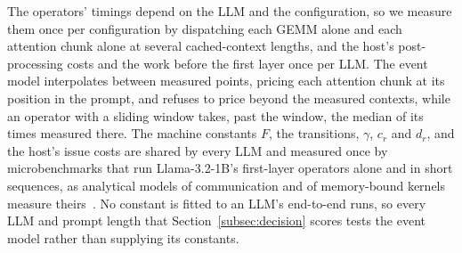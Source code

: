The operators' timings depend on the LLM and the configuration, so we measure them once per configuration by dispatching each GEMM alone and each attention chunk alone at several cached-context lengths, and the host's post-processing costs and the work before the first layer once per LLM.
The event model interpolates between measured points, pricing each attention chunk at its position in the prompt, and refuses to price beyond the measured contexts, while an operator with a sliding window takes, past the window, the median of its times measured there.
The machine constants $F$, the transitions, $\gamma$, $c_r$ and $d_r$, and the host's issue costs are shared by every LLM and measured once by microbenchmarks that run Llama-3.2-1B's first-layer operators alone and in short sequences, as analytical models of communication and of memory-bound kernels measure theirs~\citep{culler1993logp,williams2009roofline}.
No constant is fitted to an LLM's end-to-end runs, so every LLM and prompt length that Section~\ref{subsec:decision} scores tests the event model rather than supplying its constants.

